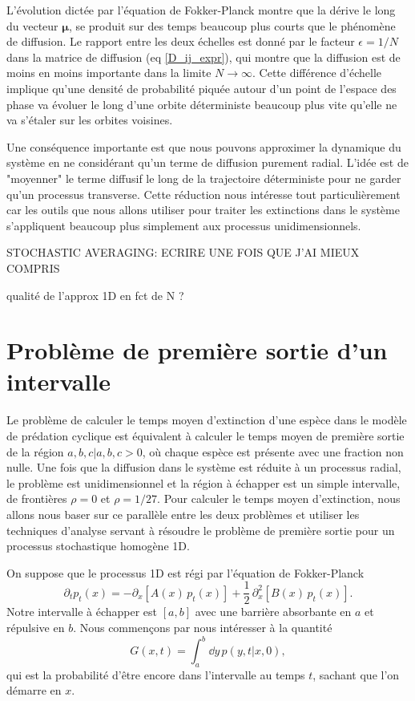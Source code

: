 \documentclass[openany,a4paper,12pt]{article}
\begin{document}
\par L'évolution dictée par l'équation de Fokker-Planck montre que la dérive le long du vecteur $\boldsymbol \mu$, se produit sur des temps beaucoup plus courts que le phénomène de diffusion. Le rapport entre les deux échelles est donné par le facteur $\epsilon = 1/N$ dans la matrice de diffusion (eq \ref{D_ij_expr}), qui montre que la diffusion est de moins en moins importante dans la limite $N\rightarrow\infty$. Cette différence d'échelle implique qu'une densité de probabilité piquée autour d'un point de l'espace des phase va évoluer le long d'une orbite déterministe beaucoup plus vite qu'elle ne va s'étaler sur les orbites voisines.

\par Une conséquence importante est que nous pouvons approximer la dynamique du système en ne considérant qu'un terme de diffusion purement radial. L'idée est de "moyenner" le terme diffusif le long de la trajectoire déterministe pour ne garder qu'un processus transverse.
Cette réduction nous intéresse tout particulièrement car les outils que nous allons utiliser pour traiter les extinctions dans le système s'appliquent beaucoup plus simplement aux processus unidimensionnels.

{\color{red} STOCHASTIC AVERAGING: ECRIRE UNE FOIS QUE J'AI MIEUX COMPRIS}

{\color{red} qualité de l'approx 1D en fct de N ?}

\section{Problème de première sortie d'un intervalle}

\par Le problème de calculer le temps moyen d'extinction d'une espèce dans le modèle de prédation cyclique est équivalent à calculer le temps moyen de première sortie de la région ${a,b,c|a,b,c>0}$, où chaque espèce est présente avec une fraction non nulle. Une fois que la diffusion dans le système est réduite à un processus radial, le problème est unidimensionnel et la région à échapper est un simple intervalle, de frontières $\rho=0$ et $\rho=1/27$. Pour calculer le temps moyen d'extinction, nous allons nous baser sur ce parallèle entre les deux problèmes et utiliser les techniques d'analyse servant à résoudre le problème de première sortie pour un processus stochastique homogène 1D.

\par On suppose que le processus 1D est régi par l'équation de Fokker-Planck
%
\begin{equation}\label{echap_eq_FP}
	\partial_t p_t(x) = - \partial_x[ A(x) \, p_t(x) ] + \frac 12 \, \partial_x^2 [ B(x) \, p_t(x) ] .
\end{equation}
%
Notre intervalle à échapper est $[a,b]$ avec une barrière absorbante en $a$ et répulsive en $b$. Nous commençons par nous intéresser à la quantité 
%
\begin{equation}\label{echap_def_G}
	G(x,t) = \int_a^b \dd y \, p(y,t|x,0),
\end{equation}
%
qui est la probabilité d'être encore dans l'intervalle au temps $t$, sachant que l'on démarre en $x$.
\end{document}
